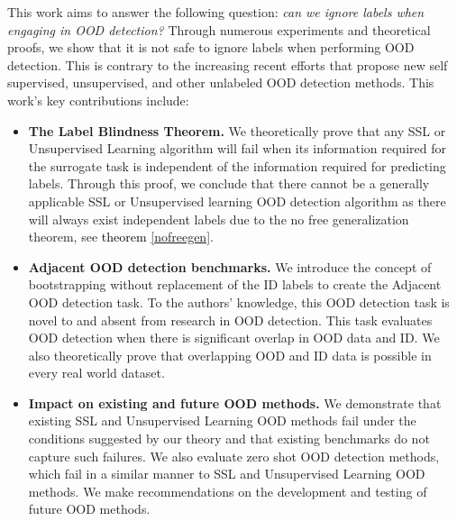 \documentclass{article} %
\theoremstyle{plain}
\theoremstyle{definition}
\theoremstyle{remark}
\begin{document}
This work aims to answer the following question: \emph{can we ignore labels when engaging in OOD detection?} Through numerous experiments and theoretical proofs, we show that it is not safe to ignore labels when performing OOD detection. This is contrary to the increasing recent efforts that propose new self supervised, unsupervised, and other unlabeled OOD detection methods. This work's key contributions include: 
\begin{itemize}[nosep,topsep=0.25pt,leftmargin=4mm]
\item \textbf{The Label Blindness Theorem.} We theoretically prove that any SSL or Unsupervised Learning algorithm will fail when its information required for the surrogate task is independent of the information required for predicting labels. Through this proof, we conclude that there cannot be a generally applicable SSL or Unsupervised learning OOD detection algorithm as there will always exist independent labels due to the no free generalization theorem, see \textcolor{black}{theorem \ref{nofreegen}}.  

\item \textbf{Adjacent OOD detection benchmarks. } We introduce the concept of bootstrapping without replacement of the ID labels to create the Adjacent OOD detection task. To the authors' knowledge, this OOD detection task is novel to and absent from research in OOD detection. This task evaluates OOD detection when there is significant overlap in OOD data and ID. We also theoretically prove that overlapping OOD and ID data is possible in every real world dataset.  
\item \textbf{Impact on existing and future OOD methods.} We demonstrate that existing SSL and Unsupervised Learning OOD methods fail under the conditions suggested by our theory and that existing benchmarks do not capture such failures. We also evaluate zero shot OOD detection methods, which fail in a similar manner to SSL and Unsupervised Learning OOD methods. We make recommendations on the development and testing of future OOD methods.
\end{itemize}
\end{document}
